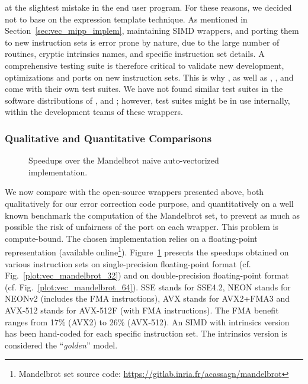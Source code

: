 at the slightest mistake in the end user program. For these reasons, we decided
not to base \MIPP on the expression template technique. As mentioned in
Section~\ref{sec:vec_mipp_implem}, maintaining SIMD wrappers, and porting them
to new instruction sets is error prone by nature, due to the large number of
routines, cryptic intrinsics names, and specific instruction set details. A
comprehensive testing suite is therefore critical to validate new development,
optimizations and ports on new instruction sets. This is why \MIPP, as well as
\Vc, \BoostSIMD, \simdpp and \bSIMD come with their own test suites. We have not
found similar test suites in the software distributions of \VCL, \xsimd and
\TSIMD; however, test suites might be in use internally, within the development
teams of these wrappers.

\subsubsection{Qualitative and Quantitative Comparisons}

\begin{figure}[htp]
  \centering
  \quad
  \caption{Speedups over the Mandelbrot naive auto-vectorized implementation.}
  \label{plot:vec_mandelbrot}
\end{figure}

We now compare \MIPP with the open-source wrappers presented above, both
qualitatively for our error correction code purpose, and quantitatively on a
well known benchmark the computation of the Mandelbrot set, to prevent as much
as possible the risk of unfairness of the port on each wrapper. This problem is
compute-bound. The chosen implementation relies on a floating-point
representation (available online\footnote{Mandelbrot set source code:
\url{https://gitlab.inria.fr/acassagn/mandelbrot}}).
Figure~\ref{plot:vec_mandelbrot} presents the speedups obtained on various
instruction sets on single-precision floating-point format (cf.
Fig.~\ref{plot:vec_mandelbrot_32}) and on double-precision floating-point format
(cf. Fig.~\ref{plot:vec_mandelbrot_64}). SSE stands for SSE4.2, NEON stands for
NEONv2 (includes the FMA instructions), AVX stands for AVX2+FMA3 and AVX-512
stands for AVX-512F (with FMA instructions). The FMA benefit ranges from 17\%
(AVX2) to 26\% (AVX-512). An SIMD with intrinsics version has been hand-coded
for each specific instruction set. The intrinsics version is considered the
``\emph{golden}'' model.

